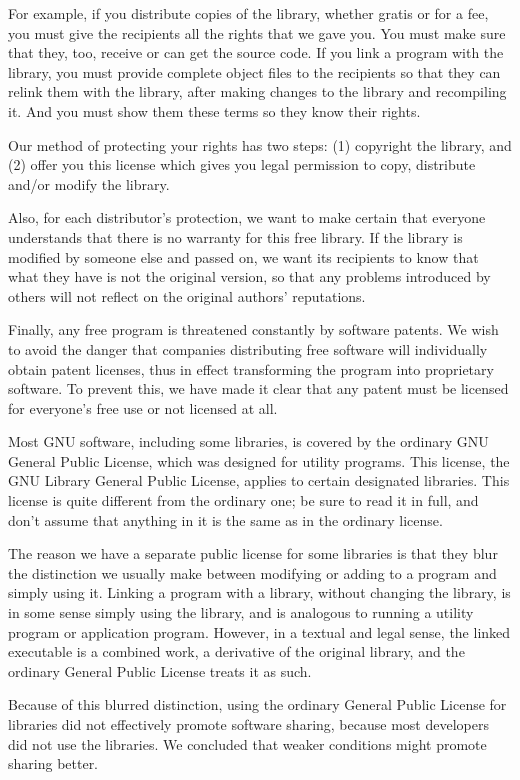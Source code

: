 \begin{multicols}{3}
For example, if you distribute copies of the library, whether gratis or for
a fee, you must give the recipients all the rights that we gave you. You
must make sure that they, too, receive or can get the source code. If you
link a program with the library, you must provide complete object files to
the recipients so that they can relink them with the library, after making
changes to the library and recompiling it. And you must show them these
terms so they know their rights.

Our method of protecting your rights has two steps: (1) copyright the
library, and (2) offer you this license which gives you legal permission to
copy, distribute and/or modify the library.

Also, for each distributor's protection, we want to make certain that
everyone understands that there is no warranty for this free library. If
the library is modified by someone else and passed on, we want its
recipients to know that what they have is not the original version, so that
any problems introduced by others will not reflect on the original authors'
reputations.

Finally, any free program is threatened constantly by software patents. We
wish to avoid the danger that companies distributing free software will
individually obtain patent licenses, thus in effect transforming the
program into proprietary software. To prevent this, we have made it clear
that any patent must be licensed for everyone's free use or not licensed at
all.

Most GNU software, including some libraries, is covered by the ordinary GNU
General Public License, which was designed for utility programs. This
license, the GNU Library General Public License, applies to certain
designated libraries. This license is quite different from the ordinary
one; be sure to read it in full, and don't assume that anything in it is
the same as in the ordinary license.

The reason we have a separate public license for some libraries is that
they blur the distinction we usually make between modifying or adding to a
program and simply using it. Linking a program with a library, without
changing the library, is in some sense simply using the library, and is
analogous to running a utility program or application program. However, in
a textual and legal sense, the linked executable is a combined work, a
derivative of the original library, and the ordinary General Public License
treats it as such.

Because of this blurred distinction, using the ordinary General Public
License for libraries did not effectively promote software sharing, because
most developers did not use the libraries. We concluded that weaker
conditions might promote sharing better.


\end{multicols}
